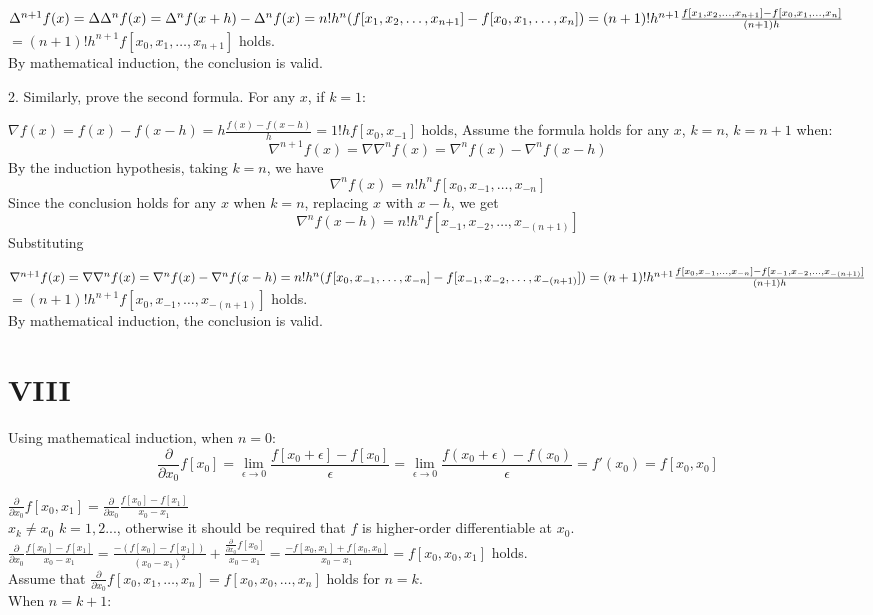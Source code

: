 \documentclass[a4paper]{article}
\begin{document}
$\Delta^{n+1} f(x) = \Delta \Delta^n f(x) = \Delta^n f(x+h) - \Delta^n f(x) = n! h^n (f[x_1, x_2, \ldots, x_{n+1}] - f[x_0, x_1, \ldots, x_n]) \\ 
=(n+1)! h^{n+1} \frac{f[x_1, x_2, \ldots, x_{n+1}] - f[x_0, x_1, \ldots, x_n]}{(n+1)h}$
\(= (n+1)! h^{n+1} f[x_0, x_1, \ldots, x_{n+1}] \) holds.\\
By mathematical induction, the conclusion is valid.

2. Similarly, prove the second formula.
For any \( x \), if \( k = 1 \):

\(\nabla f(x) = f(x) - f(x-h) = h \frac{f(x) - f(x-h)}{h} = 1! h f[x_0, x_{-1}] \) holds,
Assume the formula holds for any \( x \), \( k = n \), \( k = n + 1 \) when:
\[
\nabla^{n+1} f(x) = \nabla \nabla^n f(x) = \nabla^n f(x) - \nabla^n f(x-h)
\]
By the induction hypothesis, taking \( k = n \), we have
\[
\nabla^n f(x) = n! h^n f[x_0, x_{-1}, \ldots, x_{-n}]
\]
Since the conclusion holds for any \( x \) when \( k = n \), replacing \( x \) with \( x - h \), we get
\[
\nabla^n f(x-h) = n! h^n f[x_{-1}, x_{-2}, \ldots, x_{-(n+1)}]
\]
Substituting

$\nabla^{n+1} f(x) = \nabla \nabla^n f(x) = \nabla^n f(x) - \nabla^n f(x-h) = n! h^n (f[x_0, x_{-1}, \ldots, x_{-n}] - f[x_{-1}, x_{-2}, \ldots, x_{-(n+1)}]) \\
= (n+1)! h^{n+1} \frac{f[x_0, x_{-1}, \ldots, x_{-n}] - f[x_{-1}, x_{-2}, \ldots, x_{-(n+1)}]}{(n+1)h}$
\(= (n+1)! h^{n+1} f[x_0, x_{-1}, \ldots, x_{-{(n+1)}}] \) holds.\\
By mathematical induction, the conclusion is valid.

\section*{VIII}
Using mathematical induction, when \( n = 0 \):
\[
\frac{\partial}{\partial x_0} f[x_0] = \lim_{\epsilon \to 0} \frac{f[x_0 + \epsilon] - f[x_0]}{\epsilon} = \lim_{\epsilon \to 0} \frac{f(x_0 + \epsilon) - f(x_0)}{\epsilon} = f'(x_0) = f[x_0, x_0]
\]

\(\frac{\partial}{\partial x_0} f[x_0, x_1] = \frac{\partial}{\partial x_0} \frac{f[x_0] - f[x_1]}{x_0 - x_1}\)\\
\( x_k \neq x_0\) \( k=1,2...\), otherwise it should be required that \( f \) is higher-order differentiable at \( x_0 \).\\
\(\frac{\partial}{\partial x_0} \frac{f[x_0] - f[x_1]}{x_0 - x_1}= \frac{-(f[x_0] - f[x_1])}{(x_0 - x_1)^2} + \frac{\frac{\partial}{\partial x_0} f[x_0]}{x_0 - x_1} = \frac{-f[x_0, x_1] + f[x_0, x_0]}{x_0 - x_1} = f[x_0, x_0, x_1] \) holds.\\
Assume that \( \frac{\partial}{\partial x_0} f[x_0, x_1, \ldots, x_n] = f[x_0, x_0, \ldots, x_n] \) holds for \( n = k \).\\
When \( n = k + 1 \):\\
\end{document}
